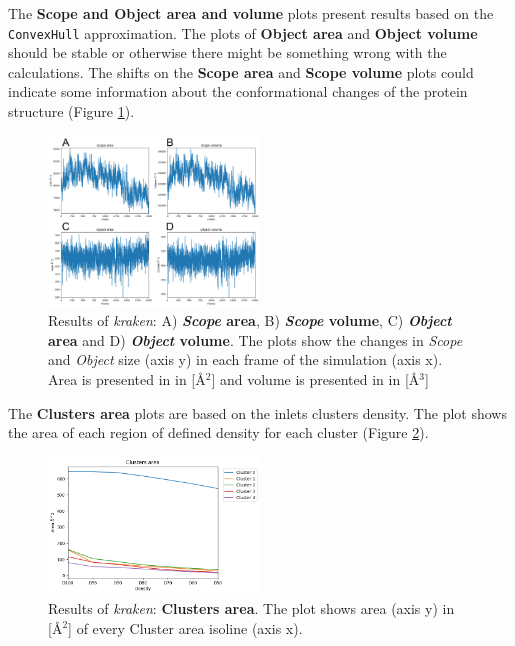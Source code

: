 \documentclass[9pt,tutorial]{livecoms}
\begin{document}
The \textbf{Scope and Object area and volume} plots present results based on the \texttt{ConvexHull} approximation. The plots of \textbf{Object area} and \textbf{Object volume} should be stable or otherwise there might be something wrong with the calculations. The shifts on the \textbf{Scope area} and \textbf{Scope volume} plots could indicate some information about the conformational changes of the protein structure (Figure \ref{Tut3.2}).

\begin{figure}[htb!]
\centering
\includegraphics[width=0.5\textwidth]{Tut3.2.png}
\caption{Results of \textit{kraken}: A) \textbf{\textit{Scope} area}, B) \textbf{\textit{Scope} volume}, C) \textbf{\textit{Object} area} and D) \textbf{\textit{Object} volume}. The plots show the changes in \textit{Scope} and \textit{Object} size (axis y) in each frame of the simulation (axis x). Area is presented in in [Å\( \displaystyle ^{2}\)] and volume is presented in in [Å\( \displaystyle ^{3}\)]} 
\label{Tut3.2}
\end{figure}

The \textbf{Clusters area} plots are based on the inlets clusters density. The plot shows the area of each region of defined density for each cluster (Figure \ref{Tut3.3}).

\begin{figure}[htb!]
\centering
\includegraphics[width=0.5\textwidth]{Tut3.3.png}
\caption{Results of \textit{kraken}: \textbf{Clusters area}. The plot shows area (axis y) in [Å\( \displaystyle ^{2}\)] of every Cluster area isoline (axis x).}
\label{Tut3.3}
\end{figure}
\end{document}
